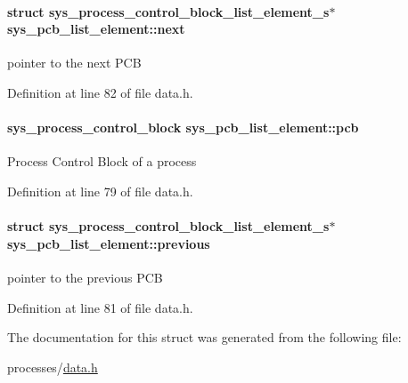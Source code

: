 \paragraph[{next}]{\setlength{\rightskip}{0pt plus 5cm}struct sys\+\_\+process\+\_\+control\+\_\+block\+\_\+list\+\_\+element\+\_\+s$\ast$ sys\+\_\+pcb\+\_\+list\+\_\+element\+::next}\label{structsys__pcb__list__element_a321af4d0362765c86e066b3ca4913b22}
pointer to the next P\+C\+B 

Definition at line 82 of file data.\+h.

\hypertarget{structsys__pcb__list__element_acb5a7246aa5eec849c42eafb63105088}{}
\paragraph[{pcb}]{\setlength{\rightskip}{0pt plus 5cm}sys\+\_\+process\+\_\+control\+\_\+block sys\+\_\+pcb\+\_\+list\+\_\+element\+::pcb}\label{structsys__pcb__list__element_acb5a7246aa5eec849c42eafb63105088}
Process Control Block of a process 

Definition at line 79 of file data.\+h.

\hypertarget{structsys__pcb__list__element_a15f2b704a96be29b91fc99a7c7ed6f83}{}
\paragraph[{previous}]{\setlength{\rightskip}{0pt plus 5cm}struct sys\+\_\+process\+\_\+control\+\_\+block\+\_\+list\+\_\+element\+\_\+s$\ast$ sys\+\_\+pcb\+\_\+list\+\_\+element\+::previous}\label{structsys__pcb__list__element_a15f2b704a96be29b91fc99a7c7ed6f83}
pointer to the previous P\+C\+B 

Definition at line 81 of file data.\+h.



The documentation for this struct was generated from the following file\+:\begin{DoxyCompactItemize}
\item 
processes/\hyperlink{data_8h}{data.\+h}\end{DoxyCompactItemize}
